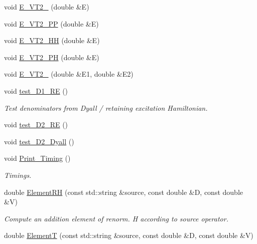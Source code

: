 \begin{DoxyCompactItemize}
\item 
void \mbox{\hyperlink{classforte_1_1_m_c_s_r_g_p_t2___m_o_a32946f4fae2b5da8d964b9ef5290061d}{E\+\_\+\+V\+T2\+\_}} (double \&E)
\item 
void \mbox{\hyperlink{classforte_1_1_m_c_s_r_g_p_t2___m_o_a4b7373616732797d0d4130cfec596dd3}{E\+\_\+\+V\+T2\+\_\+PP}} (double \&E)
\item 
void \mbox{\hyperlink{classforte_1_1_m_c_s_r_g_p_t2___m_o_ad1b584d2141a26a890fe50b2860e53a3}{E\+\_\+\+V\+T2\+\_\+HH}} (double \&E)
\item 
void \mbox{\hyperlink{classforte_1_1_m_c_s_r_g_p_t2___m_o_ac17b6c997087406c6a6d649c7d974829}{E\+\_\+\+V\+T2\+\_\+PH}} (double \&E)
\item 
void \mbox{\hyperlink{classforte_1_1_m_c_s_r_g_p_t2___m_o_ae5c2836e64b6755ff5211e9458b75407}{E\+\_\+\+V\+T2\+\_}} (double \&E1, double \&E2)
\item 
void \mbox{\hyperlink{classforte_1_1_m_c_s_r_g_p_t2___m_o_a5bd7a91d8461cff512c3cfafd0578e27}{test\+\_\+\+D1\+\_\+\+RE}} ()
\begin{DoxyCompactList}\small\item\em Test denominators from Dyall / retaining excitation Hamiltonian. \end{DoxyCompactList}\item 
void \mbox{\hyperlink{classforte_1_1_m_c_s_r_g_p_t2___m_o_a2a27b2e71bb7a35f5bdc1fb12732fa79}{test\+\_\+\+D2\+\_\+\+RE}} ()
\item 
void \mbox{\hyperlink{classforte_1_1_m_c_s_r_g_p_t2___m_o_a89126beac8ce5676b5b49e8b67c17c61}{test\+\_\+\+D2\+\_\+\+Dyall}} ()
\item 
void \mbox{\hyperlink{classforte_1_1_m_c_s_r_g_p_t2___m_o_a3794ac7eb215ae0ef6bbfc55d4726d7e}{Print\+\_\+\+Timing}} ()
\begin{DoxyCompactList}\small\item\em Timings. \end{DoxyCompactList}\item 
double \mbox{\hyperlink{classforte_1_1_m_c_s_r_g_p_t2___m_o_aff400e48ffc929eeb61bbe1e32407707}{Element\+RH}} (const std\+::string \&source, const double \&D, const double \&V)
\begin{DoxyCompactList}\small\item\em Compute an addition element of renorm. H according to source operator. \end{DoxyCompactList}\item 
double \mbox{\hyperlink{classforte_1_1_m_c_s_r_g_p_t2___m_o_a9668e316f94c15c688146a7e2d20893c}{ElementT}} (const std\+::string \&source, const double \&D, const double \&V)

\end{DoxyCompactItemize}
